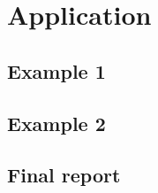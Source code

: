 \documentclass[11pt, oneside]{article}
\begin{document}
\section{Application}

\subsection{Example 1}



\subsection{Example 2}



\subsection{Final report}


\end{document}
